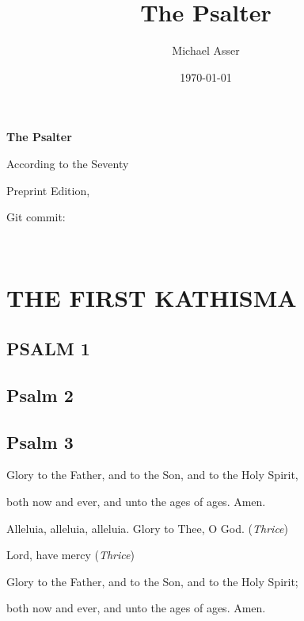 \documentclass[12pt,openany]{book}
\title{The Psalter}
\author{Michael Asser}
\date{\today}
\newcommand{\kathismabreak}{
  \medskip
  \begin{center}
  \begin{footnotesize}
  Glory to the Father, and to the Son, and to the Holy Spirit,
  
  both now and ever, and unto the ages of ages. Amen.

  Alleluia, alleluia, alleluia. Glory to Thee, O God. (\textit{Thrice})

  Lord, have mercy (\textit{Thrice})

  Glory to the Father, and to the Son, and to the Holy Spirit;
  
  both now and ever, and unto the ages of ages. Amen.
  \end{footnotesize}
  \end{center}
  \smallbreak
}
\begin{document}
\begin{titlepage}
  \begin{center}
  \vspace*{2in}

  \begin{Huge}
  \textbf{The Psalter}
  \end{Huge}

  \vspace{0.25in}
  \begin{small}
  According to the Seventy
  \end{small}

  \vfill

  \end{center}
\end{titlepage}

\newpage

\thispagestyle{empty}
\begin{center}
\vspace*{2in}
Preprint Edition, 

Git commit: 
\end{center}

\newpage

\thispagestyle{empty}
\ %

\newpage


\chapter*{THE FIRST KATHISMA}
\smallskip

\section{PSALM 1}

\smallskip
\section{Psalm 2}

\smallskip
\section{Psalm 3}


\kathismabreak
\smallskip

\pagebreak %
\end{document}
